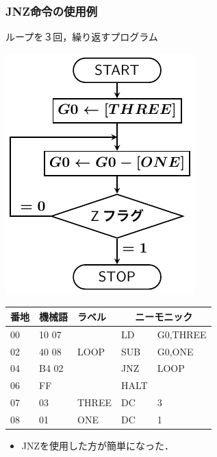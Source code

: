 \documentclass{beamer}                 %
\begin{document}
\begin{frame}
  \frametitle{JNZ命令の使用例}
  ループを３回，繰り返すプログラム\\
  \vfill
  \begin{minipage}{0.4\columnwidth}
    \centerline{\includegraphics[scale=0.7]{../Tikz/flow0C.pdf}}
  \end{minipage}
  \begin{minipage}{0.59\columnwidth}
    {\ttfamily\small\begin{center}
      \begin{tabular}{|l|l|l|l l|} \hline
        番地 & 機械語 & ラベル & \multicolumn{2}{|c|}{ニーモニック} \\
        \hline
        00 & 10 07 &           & LD   & G0,THREE              \\
        02 & 40 08 &  LOOP     & SUB  & G0,ONE                \\
        04 & B4 02 &           & JNZ  & LOOP                  \\
        06 & FF    &           & HALT &                       \\
        07 & 03    &  THREE    & DC   & 3                     \\
        08 & 01    &  ONE      & DC   & 1                     \\
        \hline
      \end{tabular}
    \end{center}}
  \end{minipage}
  \vfill
  \begin{itemize}
  \item JNZを使用した方が簡単になった．
  \end{itemize}
  \vfill
\end{frame}
\end{document}
